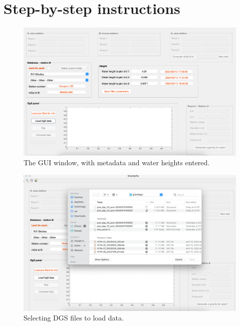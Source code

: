 \documentclass{pfpe-manual}
\begin{document}
\section{Step-by-step instructions}
\label{tie-instructions}

\begin{figure}[ht!]
\centering
\includegraphics[width=\textwidth]{figs/window_with_heights.png}
\caption{The GUI window, with metadata and water heights entered.}
\label{gui:heights}
\end{figure}

\begin{figure}[ht!]
\centering
\includegraphics[width=\textwidth]{figs/select_dgs.png}
\caption{Selecting DGS files to load data.}
\label{gui:select}
\end{figure}
\end{document}
